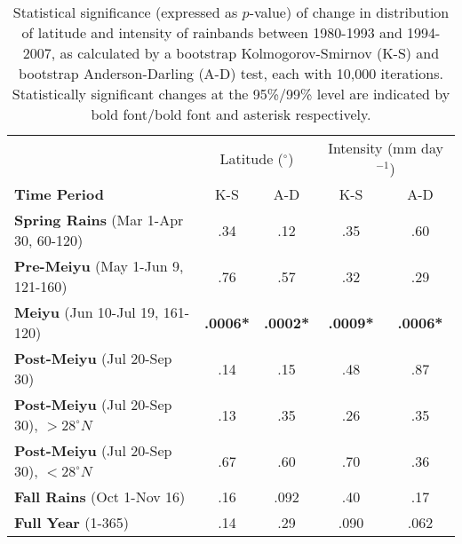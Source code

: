 \documentclass[singlecolumn,11pt]{pnas-new}
\begin{document}

\makeatletter 
\renewcommand{\thetable}{S\@arabic\c@table}
\makeatother
\setcounter{table}{1}

\begin{table}[p]

\centering
\caption{Statistical significance (expressed as $p$-value) of change in distribution of latitude and intensity of rainbands between 1980-1993 and 1994-2007, as calculated by a bootstrap Kolmogorov-Smirnov (K-S) and bootstrap Anderson-Darling (A-D) test, each with 10,000 iterations. Statistically significant changes at the 95\%/99\% level are indicated by bold font/bold font and asterisk respectively.}

\begin{tabular}{ l c c c c}
												& \multicolumn{2}{c}{Latitude ($^\circ$)} & \multicolumn{2}{c}{Intensity (mm day$^{-1}$)} \\
	 \textbf{Time Period} 							& K-S 			& A-D 			& K-S 			& A-D \\
	 \hline
	\textbf{Spring Rains} (Mar 1-Apr 30, 60-120)  		& .34			& .12			& .35			& .60 \\
	\textbf{Pre-Meiyu} (May 1-Jun 9, 121-160)  		& .76			&  .57 			& .32			& .29 \\
	\textbf{Meiyu} (Jun 10-Jul 19, 161-120)			& \textbf{.0006*}	&  \textbf{.0002*}	&  \textbf{.0009*}	& \textbf{.0006*} \\	
	\textbf{Post-Meiyu} (Jul 20-Sep 30) 				& .14			&  .15 			&  .48			& .87 \\
	\textbf{Post-Meiyu} (Jul 20-Sep 30), $>28^{\circ}N$   & .13			&  .35 			&  .26 			& .35 \\	
	\textbf{Post-Meiyu} (Jul 20-Sep 30), $<28^{\circ}N$   & .67			&  .60			&  .70			& .36 \\	
	\textbf{Fall Rains} (Oct 1-Nov 16) 					& .16	 		&  .092			&  .40 			& .17 \\	
	\textbf{Full Year} (1-365)						& .14			&  .29			&  .090	 		& .062 \\	
	
\end{tabular}
\end{table}
\end{document}
